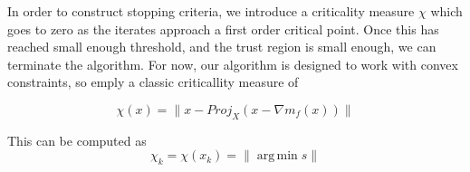 \documentclass{article}
\newcommand{\domain}{X}
\DeclareMathOperator*{\argmin}{arg\,min}
\begin{document}
In order to construct stopping criteria, we introduce a criticality measure $\chi$ which goes to zero as the iterates approach a first order critical point.
Once this has reached small enough threshold, and the trust region is small enough, we can terminate the algorithm.
For now, our algorithm is designed to work with convex constraints, so emply a classic criticallity measure of

\[
\chi(x) = \|x - Proj_{\domain}(x - \nabla m_f(x))\|
\]

This can be computed as 
\label{critical}
\[
\chi_k = \chi(x_k) = \| \argmin s \|
\]







\end{document}
